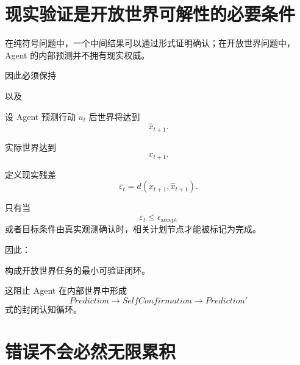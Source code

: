 \section{现实验证是开放世界可解性的必要条件}

在纯符号问题中，一个中间结果可以通过形式证明确认；在开放世界问题中，Agent 的内部预测并不拥有现实权威。

因此必须保持
\begin{statementbox}
\centering
{}
\end{statementbox}
以及
\begin{statementbox}
\centering
{}
\end{statementbox}

设 Agent 预测行动 $u_t$ 后世界将达到
\begin{equation}
\hat x_{t+1}.
\end{equation}

实际世界达到
\begin{equation}
x_{t+1}.
\end{equation}

定义现实残差
\begin{equation}
\varepsilon_t
=
d(
x_{t+1},
\hat x_{t+1}
).
\end{equation}

只有当
\begin{equation}
\varepsilon_t
\leq
\epsilon_{\mathrm{accept}}
\end{equation}
或者目标条件由真实观测确认时，相关计划节点才能被标记为完成。

因此：

\begin{statementbox}
\centering
{}
\end{statementbox}

构成开放世界任务的最小可验证闭环。

这阻止 Agent 在内部世界中形成
\begin{equation}
Prediction
\rightarrow
SelfConfirmation
\rightarrow
Prediction'
\end{equation}
式的封闭认知循环。

\section{错误不会必然无限累积}

